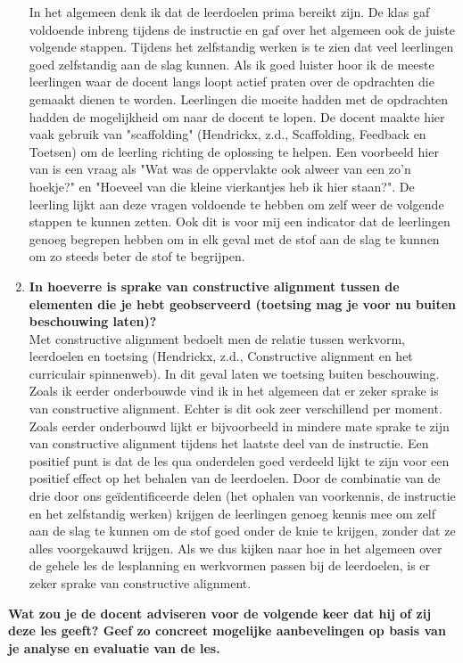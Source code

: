 \documentclass{article}
\begin{document}
\begin{enumerate}[label=(\alph*)]
                        In het algemeen denk ik dat de leerdoelen prima bereikt zijn. De klas gaf voldoende inbreng tijdens de instructie en gaf over het algemeen ook de juiste volgende stappen. Tijdens het zelfstandig werken is te zien dat veel leerlingen goed zelfstandig aan de slag kunnen. Als ik goed luister hoor ik de meeste leerlingen waar de docent langs loopt actief praten over de opdrachten die gemaakt dienen te worden. Leerlingen die moeite hadden met de opdrachten hadden de mogelijkheid om naar de docent te lopen. De docent maakte hier vaak gebruik van "scaffolding" (Hendrickx, z.d., Scaffolding, Feedback en Toetsen) om de leerling richting de oplossing te helpen. Een voorbeeld hier van is een vraag als "Wat was de oppervlakte ook alweer van een zo'n hoekje?" en "Hoeveel van die kleine vierkantjes heb ik hier staan?". De leerling lijkt aan deze vragen voldoende te hebben om zelf weer de volgende stappen te kunnen zetten. Ook dit is voor mij een indicator dat de leerlingen genoeg begrepen hebben om in elk geval met de stof aan de slag te kunnen om zo steeds beter de stof te begrijpen.
                
                    \item \textbf{In hoeverre is sprake van constructive alignment tussen de elementen die je hebt geobserveerd (toetsing mag je voor nu buiten beschouwing laten)?} \\
                
                        Met constructive alignment bedoelt men de relatie tussen werkvorm, leerdoelen en toetsing (Hendrickx, z.d., Constructive alignment en het curriculair spinnenweb). In dit geval laten we toetsing buiten beschouwing. Zoals ik eerder onderbouwde vind ik in het algemeen dat er zeker sprake is van constructive alignment. Echter is dit ook zeer verschillend per moment. Zoals eerder onderbouwd lijkt er bijvoorbeeld in mindere mate sprake te zijn van constructive alignment tijdens het laatste deel van de instructie. Een positief punt is dat de les qua onderdelen goed verdeeld lijkt te zijn voor een positief effect op het behalen van de leerdoelen. Door de combinatie van de drie door ons geïdentificeerde delen (het ophalen van voorkennis, de instructie en het zelfstandig werken) krijgen de leerlingen genoeg kennis mee om zelf aan de slag te kunnen om de stof goed onder de knie te krijgen, zonder dat ze alles voorgekauwd krijgen. Als we dus kijken naar hoe in het algemeen over de gehele les de lesplanning en werkvormen passen bij de leerdoelen, is er zeker sprake van constructive alignment.
                
                \end{enumerate}
                \textbf{Wat zou je de docent adviseren voor de volgende keer dat hij of zij deze les geeft? Geef zo concreet mogelijke aanbevelingen op basis van je analyse en evaluatie van de les.} \\
\end{document}
